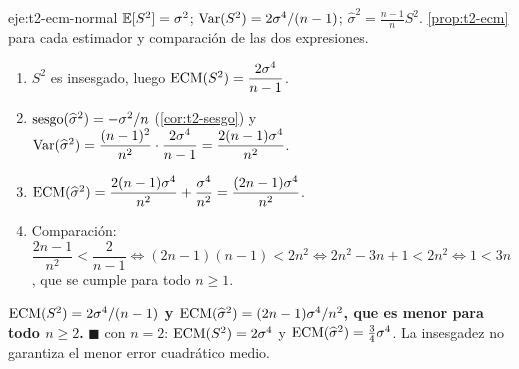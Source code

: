\begin{solucion}{eje:t2-ecm-normal}
\datos $\mathbb{E}[S^{2}]=\sigma^{2}$; $\operatorname{Var}(S^{2})=2\sigma^{4}/(n-1)$; $\widehat\sigma^{2}=\frac{n-1}{n}S^{2}$.
\planteamiento \cref{prop:t2-ecm} para cada estimador y comparación de las dos expresiones.
\pasos
\begin{enumerate}[label=\arabic*.]
  \item $S^{2}$ es insesgado, luego $\operatorname{ECM}(S^{2})=\dfrac{2\sigma^{4}}{n-1}$.
  \item $\operatorname{sesgo}(\widehat\sigma^{2})=-\sigma^{2}/n$ (\cref{cor:t2-sesgo}) y $\operatorname{Var}(\widehat\sigma^{2})=\dfrac{(n-1)^{2}}{n^{2}}\cdot\dfrac{2\sigma^{4}}{n-1}=\dfrac{2(n-1)\sigma^{4}}{n^{2}}$.
  \item $\operatorname{ECM}(\widehat\sigma^{2})=\dfrac{2(n-1)\sigma^{4}}{n^{2}}+\dfrac{\sigma^{4}}{n^{2}}=\dfrac{(2n-1)\sigma^{4}}{n^{2}}$.
  \item Comparación: $\dfrac{2n-1}{n^{2}}<\dfrac{2}{n-1}\iff(2n-1)(n-1)<2n^{2}\iff2n^{2}-3n+1<2n^{2}\iff1<3n$, que se cumple para todo $n\ge1$.
\end{enumerate}
\resultado \textbf{$\operatorname{ECM}(S^{2})=2\sigma^{4}/(n-1)$ y $\operatorname{ECM}(\widehat\sigma^{2})=(2n-1)\sigma^{4}/n^{2}$, que es menor para todo $n\ge2$.} $\blacksquare$
\comprobacion con $n=2$: $\operatorname{ECM}(S^{2})=2\sigma^{4}$ y $\operatorname{ECM}(\widehat\sigma^{2})=\frac34\sigma^{4}$. La insesgadez no garantiza el menor error cuadrático medio.
\end{solucion}

